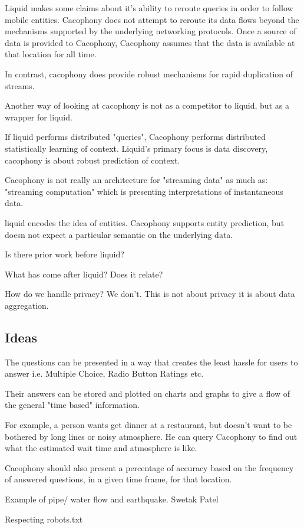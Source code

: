 Liquid makes some claims about it's ability to reroute queries in order to
follow mobile entities.  Cacophony does not attempt to reroute its data flows
beyond the mechanisms supported by the underlying networking protocols.  Once a
source of data is provided to Cacophony, Cacophony assumes that the data is
available at that location for all time.

In contrast, cacophony does provide robust mechanisms for rapid duplication of
streams.  

Another way of looking at cacophony is not as a competitor to liquid, but as a
wrapper for liquid. 

If liquid performs distributed "queries", Cacophony performs distributed
statistically learning of context.  Liquid's primary focus is data discovery,
cacophony is about robust prediction of context.

Cacophony is not really an architecture for "streaming data" as much as:
"streaming computation" which is presenting interpretations of instantaneous
data.

liquid encodes the idea of entities.  Cacophony supports entity prediction, but
doesn not expect a particular semantic on the underlying data.



Is there prior work before liquid?

What has come after liquid?  Does it relate?
\cite{Hong2004}


How do we handle privacy? We don't.  This is not about privacy it is about data
aggregation.  



\subsection{Ideas}

The questions can be presented in a way that creates the least hassle for users
to answer i.e. Multiple Choice, Radio Button Ratings etc.

Their answers can be
stored and plotted on charts and graphs to give a flow of the general "time
based" information. 

For
example, a person wants get dinner at a restaurant, but doesn't want to be
bothered by long lines or noisy atmosphere. He can query Cacophony to find out
what the estimated wait time and atmosphere is like. 

Cacophony should also
present a percentage of accuracy based on the frequency of answered questions,
in a given time frame, for that location.



Example of pipe/ water flow and earthquake.
Swetak Patel

Respecting robots.txt


